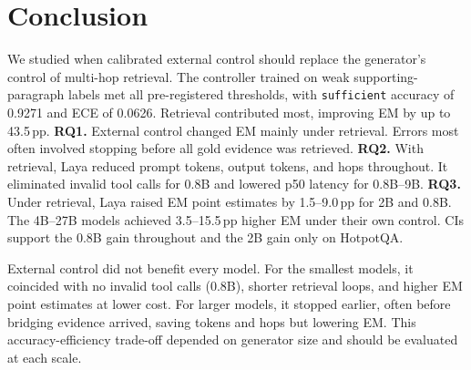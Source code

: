 \section{Conclusion}
\label{sec:conclusion}

We studied when calibrated external control should replace the generator's control of
multi-hop retrieval. The controller trained on weak supporting-paragraph labels met
all pre-registered thresholds, with \texttt{sufficient} accuracy of 0.9271 and ECE of
0.0626. Retrieval contributed most, improving EM by up to 43.5\,pp. \textbf{RQ1.}
External control changed EM mainly under retrieval. Errors most often involved stopping
before all gold evidence was retrieved. \textbf{RQ2.} With retrieval, Laya reduced prompt
tokens, output tokens, and hops throughout. It eliminated invalid tool calls for 0.8B
and lowered p50 latency for 0.8B--9B. \textbf{RQ3.} Under retrieval, Laya raised EM
point estimates by 1.5--9.0\,pp for 2B and 0.8B. The 4B--27B models achieved
3.5--15.5\,pp higher EM under their own control. CIs support the 0.8B gain throughout
and the 2B gain only on HotpotQA.

External control did not benefit every model. For the smallest models, it coincided with
no invalid tool calls (0.8B), shorter retrieval loops, and higher EM point estimates at
lower cost. For larger models, it stopped earlier, often before bridging evidence
arrived, saving tokens and hops but lowering EM. This accuracy-efficiency trade-off
depended on generator size and should be evaluated at each scale.
